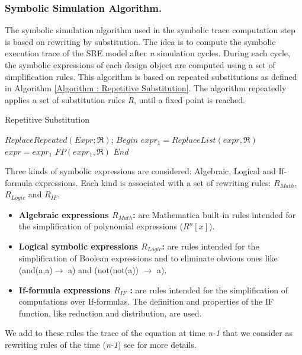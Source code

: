 \documentclass[submission,copyright,creativecommons]{eptcs}
\begin{document}
\subsubsection{Symbolic Simulation Algorithm.}
The symbolic simulation algorithm used in the symbolic trace computation step is based on rewriting by substitution. The idea is to compute the symbolic execution trace of the SRE model after \emph{n} simulation cycles. During each cycle, the symbolic expressions of each design object are computed using a set of simplification rules. This algorithm is based on repeated substitutions as defined in Algorithm \ref{Algorithm : Repetitive Substitution}. The algorithm repeatedly applies a set of substitution rules \emph{R}, until a fixed point is reached.
\begin{algorithm}
\caption{Repetitive Substitution}
\label{Algorithm : Repetitive Substitution}
\begin{algorithmic}[1]
\STATE $ReplaceRepeated(Expr;\Re)$;
\STATE $Begin$
\REPEAT
\STATE $expr_{1}=ReplaceList(expr,\Re)$
\STATE $expr=expr_{1}$
\UNTIL $FP(expr_{1},\Re)$
\STATE $End$
\end{algorithmic}
\end{algorithm}

Three kinds of symbolic expressions are considered: Algebraic, Logical and If-formula expressions. Each kind is associated with a set of rewriting rules: \(R_{Math}\), \(R_{Logic}\) and \(R_{IF}\).

\begin{itemize}
  \item \textbf{Algebraic expressions \(R_{Math}\):} are Mathematica built-in rules intended for the simplification of polynomial expressions (\(R^{n}[x]\)).
  \item \textbf{Logical symbolic expressions \(R_{Logic}\):} are rules intended for the simplification of Boolean expressions and to eliminate obvious ones like (and(a,a)\(\rightarrow\) a) and (not(not(a)) \(\rightarrow\) a).
  \item \textbf{If-formula expressions \(R_{IF}\) : }are rules intended for the simplification of computations over If-formulas. The definition and properties of the IF function, like reduction and distribution, are used.
\end{itemize}

We add to these rules the trace of the equation at time \emph{n-1} that we consider as rewriting rules of the time (\emph{n-1}) see \cite{1} for more details.
\end{document}

